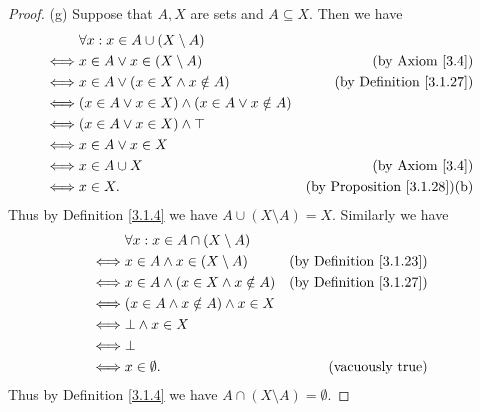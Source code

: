 \begin{proof}{(g)}
    Suppose that \(A, X\) are sets and \(A \subseteq X\).
    Then we have
    \begin{align*}
             & \forall x : x \in A \cup (X \setminus A)                                                         \\
        \iff & x \in A \lor x \in (X \setminus A)                     & \text{(by Axiom \ref{3.4})}             \\
        \iff & x \in A \lor (x \in X \land x \notin A)                & \text{(by Definition \ref{3.1.27})}     \\
        \iff & (x \in A \lor x \in X) \land (x \in A \lor x \notin A)                                           \\
        \iff & (x \in A \lor x \in X) \land \top                                                                \\
        \iff & x \in A \lor x \in X                                                                             \\
        \iff & x \in A \cup X                                         & \text{(by Axiom \ref{3.4})}             \\
        \iff & x \in X.                                               & \text{(by Proposition \ref{3.1.28})(b)}
    \end{align*}
    Thus by Definition \ref{3.1.4} we have \(A \cup (X \setminus A) = X\).
    Similarly we have
    \begin{align*}
             & \forall x : x \in A \cap (X \setminus A)                                       \\
        \iff & x \in A \land x \in (X \setminus A)      & \text{(by Definition \ref{3.1.23})} \\
        \iff & x \in A \land (x \in X \land x \notin A) & \text{(by Definition \ref{3.1.27})} \\
        \iff & (x \in A \land x \notin A) \land x \in X                                       \\
        \iff & \bot \land x \in X                                                             \\
        \iff & \bot                                                                           \\
        \iff & x \in \emptyset.                         & \text{(vacuously true)}
    \end{align*}
    Thus by Definition \ref{3.1.4} we have \(A \cap (X \setminus A) = \emptyset\).
\end{proof}

